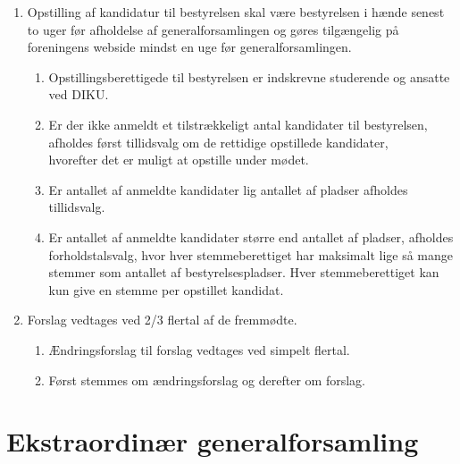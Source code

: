 \documentclass[a4paper]{article}
\newenvironment{stykenum}{
  \begin{enumerate}[%
    label=Stk.~\arabic*., ref=\textsection~\theenumi~Stk.~\arabic*, start=2]
}{\end{enumerate}}
\begin{document}
\begin{enumerate}[resume*=afsnit]

\item \label{gf-slut} Opstilling af kandidatur til bestyrelsen skal være
bestyrelsen i hænde senest to uger før afholdelse af generalforsamlingen og
gøres tilgængelig på foreningens webside mindst en uge før generalforsamlingen.

  \begin{stykenum}

  \item Opstillingsberettigede til bestyrelsen er indskrevne studerende og
        ansatte ved DIKU.

  \item Er der ikke anmeldt et tilstrækkeligt antal kandidater til bestyrelsen,
        afholdes først tillidsvalg om de rettidige opstillede kandidater,\\
        hvorefter det er muligt at opstille under mødet.

  \item Er antallet af anmeldte kandidater lig antallet af pladser afholdes
        tillidsvalg.

  \item Er antallet af anmeldte kandidater større end antallet af pladser,
        afholdes forholdstalsvalg, hvor hver stemmeberettiget har maksimalt lige
        så mange stemmer som antallet af bestyrelsespladser. Hver
        stemmeberettiget kan kun give en stemme per opstillet kandidat.

  \end{stykenum}

\item Forslag vedtages ved 2/3 flertal af de fremmødte.

  \begin{stykenum}

  \item Ændringsforslag til forslag vedtages ved simpelt flertal.

  \item Først stemmes om ændringsforslag og derefter om forslag.

  \end{stykenum}

\end{enumerate}


\section*{Ekstraordinær generalforsamling}
\end{document}
